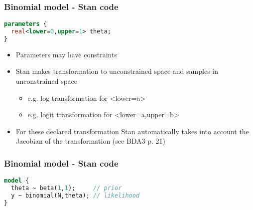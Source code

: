 \documentclass[finnish,english,t]{beamer}
\begin{document}
\begin{frame}[fragile]
  \frametitle{Binomial model - Stan code}

  {\small
\begin{lstlisting}[language=Stan]
parameters {
  real<lower=0,upper=1> theta;
}
\end{lstlisting}}

  \begin{itemize}
  \item Parameters may have constraints
  \item Stan makes transformation to unconstrained space and samples in unconstrained space
    \begin{itemize}
    \item e.g. log transformation for <lower=a> 
    \item e.g. logit transformation for <lower=a,upper=b> 
    \end{itemize}
  \item<2-> For these declared transformation Stan automatically takes
    into account the Jacobian of the transformation (see BDA3 p. 21)
  \end{itemize}
\end{frame}

\begin{frame}[fragile]
  \frametitle{Binomial model - Stan code}
  
  {\small
\begin{lstlisting}[language=Stan]
model {
  theta ~ beta(1,1);     // prior
  y ~ binomial(N,theta); // likelihood
}
\end{lstlisting}}

\end{frame} 
\end{document}

